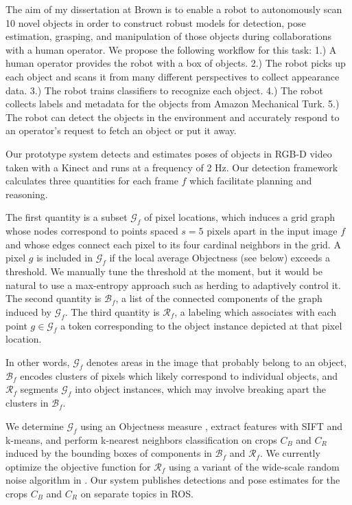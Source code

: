 \documentclass[12pt]{article}
\numberwithin{equation}{section}
\numberwithin{table}{section}
\numberwithin{figure}{section}
\begin{document}
The aim of my dissertation at Brown is to enable a robot
to autonomously scan 10 novel objects in order to construct robust models for detection,
pose estimation, grasping, and manipulation of those objects during collaborations with
a human operator. We propose the following workflow for this task: 1.) A human operator provides
the robot with a box of objects. 2.) The robot picks up each object and scans it from many different
perspectives to collect appearance data. 3.) The robot trains classifiers to recognize each object. 
4.) The robot collects labels and metadata for the objects from Amazon Mechanical Turk. 5.) The
robot can detect the objects in the environment and accurately respond to an operator's request
to fetch an object or put it away.

Our prototype system detects and estimates poses of objects in RGB-D video taken with a Kinect and
runs at a frequency of 2 Hz. Our detection framework
calculates three quantities for each frame $f$ which facilitate
planning and reasoning. 

The first quantity is a subset $\mathcal{G}_f$ of pixel locations, which induces a grid graph whose nodes
correspond to points spaced $s=5$ pixels apart in the input image $f$ and whose edges connect each pixel to its
four cardinal neighbors in the grid. A pixel $g$ is included in $\mathcal{G}_f$ if the local average Objectness (see below)
exceeds a threshold. We manually tune the threshold at the moment, but it would be natural to use a
max-entropy approach such as herding \cite{herding} to adaptively control it.
The second quantity is $\mathcal{B}_f$, a list of the connected components of the graph induced by $\mathcal{G}_f$.
The third quantity is $\mathcal{R}_f$, a labeling which associates with each point $g \in \mathcal{G}_f$ a token
corresponding to the object instance depicted at that pixel location.

In other words, $\mathcal{G}_f$ denotes areas in the image that probably belong to an object, 
$\mathcal{B}_f$ encodes clusters of pixels which likely correspond to individual objects, and $\mathcal{R}_f$
segments $\mathcal{G}_f$ into object instances, which may involve breaking apart the clusters in $\mathcal{B}_f$.

We determine $\mathcal{G}_f$ using an Objectness measure \cite{bing}, extract features with SIFT \cite{sift} 
and k-means, and perform k-nearest neighbors classification on crops $C_B$ and $C_R$ induced by the
bounding boxes of components in $\mathcal{B}_f$ and $\mathcal{R}_f$.
We currently optimize the objective function for $\mathcal{R}_f$ using a variant of the wide-scale random noise algorithm in \cite{wsrn}.
Our system publishes detections and pose estimates for the crops $C_B$ and $C_R$ on separate topics in ROS. 
\end{document}
